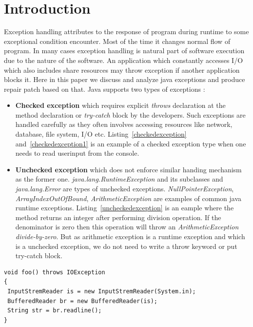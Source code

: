 

\chapter{Introduction}
\label{chapter:introduction}

Exception handling attributes to the response of program during runtime to some
exceptional condition encounter. Most of the time it changes normal flow of
program. In many cases exception handling is natural part of software execution
due to the nature of the software.
An application which constantly accesses I/O which also includes share resources
may throw exception if another application blocks it.
Here in this paper we discuss and analyze java exceptions and produce repair
patch based on that. Java supports two types of exceptions :

\begin{itemize}
  
  \item \textbf{Checked exception} which requires explicit \emph{throws}
  declaration at the method declaration or \emph{try-catch} block by the
  developers. Such exceptions are handled carefully as they often involves
  accessing resources like network, database, file system, I/O etc.
  Listing~\ref{checkedexception} and~\ref{checkedexception1} is an example of a
  checked exception type when one needs to read userinput from the console.
  
  \item \textbf{Unchecked exception} which does not enforce similar handing
  mechanism as the former one. \emph{java.lang.RuntimeException} and its
  subclasses and \emph{java.lang.Error} are types of unchecked exceptions.
  \emph{NullPointerException}, \emph{ArrayIndexOutOfBound},
  \emph{ArithmeticException} are examples of common java runtime exceptions.
  Listing~\ref{uncheckedexception} is an eample where the method returns an
  integer after performing division operation. If the denominator is zero then
  this operation will throw an \emph{ArithmeticException} \emph{divide-by-zero}.
  But as arithmetic exception is a runtime exception and which is a unchecked
  exception, we do not need to write a throw keyword or put try-catch block.
  
\end{itemize}

\onehalfspacing
\lstset{language=Java, caption=Example 1 of java checked exception,
label=checkedexception}
\begin{lstlisting}
void foo() throws IOException
{
 InputStremReader is = new InputStremReader(System.in);
 BufferedReader br = new BufferedReader(is);
 String str = br.readline();
}
\end{lstlisting}



